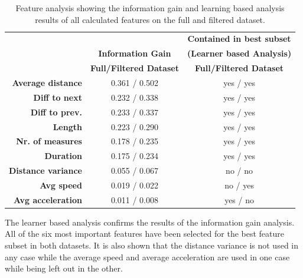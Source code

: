 \begin{table}


\centering
\bgroup
\def\arraystretch{1.4}
\begin{tabular}{| r || c | c |}
\hline
   & 
   \textbf{} & 
   \textbf{Contained in best subset} \\
   & 
   \textbf{Information Gain} & 
   \textbf{(Learner based Analysis)} \\
   & 
   \textbf{Full/Filtered Dataset} & 
   \textbf{Full/Filtered Dataset} \\
\hline
  \textbf{Average distance} & 
   0.361 / 0.502 &
   yes / yes \\
\hline
\textbf{Diff to next} & 
   0.232 / 0.338 &
   yes / yes \\
\hline
\textbf{Diff to prev.} & 
   0.233 / 0.337 &
   yes / yes \\
\hline
\textbf{Length} & 
   0.223 / 0.290 &
   yes / yes \\
\hline
\textbf{Nr. of measures} & 
   0.178 / 0.235 &
   yes / yes \\
\hline
\textbf{Duration} & 
   0.175 / 0.234 &
   yes / yes \\
\hline
\textbf{Distance variance} & 
   0.055 / 0.067 &
   no / no \\
\hline
\textbf{Avg speed} & 
   0.019 / 0.022 &
   no / yes \\
\hline
\textbf{Avg acceleration} & 
   0.011 / 0.008 &
   yes / no \\
\hline


\end{tabular}
\egroup

\caption{Feature analysis showing the information gain and learning based analysis results of all calculated features on the full and filtered dataset.}
\label{table:feature_analysis}
\end{table}



The learner based analysis confirms the results of the information gain analysis. All of the six most important features have been selected for the best feature subset in both datasets. It is also shown that the distance variance is not used in any case while the average speed and average acceleration are used in one case while being left out in the other.










